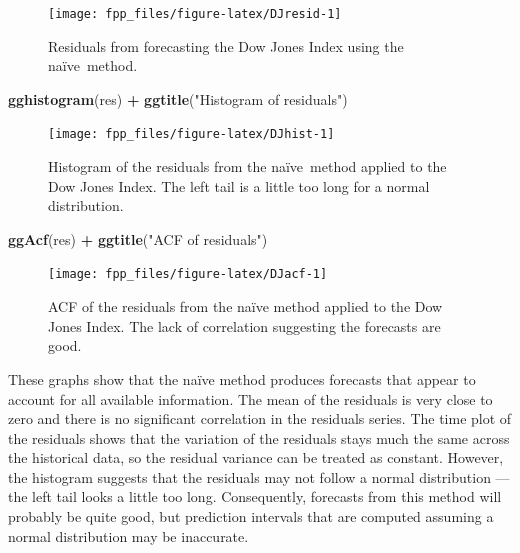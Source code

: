 \documentclass[]{book}
\newenvironment{Shaded}{\begin{snugshade}}{\end{snugshade}}
\newcommand{\KeywordTok}[1]{\textcolor[rgb]{0.13,0.29,0.53}{\textbf{#1}}}
\newcommand{\NormalTok}[1]{#1}
\newcommand{\OperatorTok}[1]{\textcolor[rgb]{0.81,0.36,0.00}{\textbf{#1}}}
\newcommand{\StringTok}[1]{\textcolor[rgb]{0.31,0.60,0.02}{#1}}
\begin{document}
\begin{figure}

{\centering \texttt{[image: fpp\_files/figure-latex/DJresid-1]} 

}

\caption{Residuals from forecasting the Dow Jones Index using the naïve method.}\label{fig:DJresid}
\end{figure}

\begin{Shaded}
\begin{Highlighting}[]
\KeywordTok{gghistogram}\NormalTok{(res) }\OperatorTok{+}\StringTok{ }\KeywordTok{ggtitle}\NormalTok{(}\StringTok{"Histogram of residuals"}\NormalTok{)}
\end{Highlighting}
\end{Shaded}

\begin{figure}

{\centering \texttt{[image: fpp\_files/figure-latex/DJhist-1]} 

}

\caption{Histogram of the residuals from the naïve method applied to the Dow Jones Index. The left tail is a little too long for a normal distribution.}\label{fig:DJhist}
\end{figure}

\begin{Shaded}
\begin{Highlighting}[]
\KeywordTok{ggAcf}\NormalTok{(res) }\OperatorTok{+}\StringTok{ }\KeywordTok{ggtitle}\NormalTok{(}\StringTok{"ACF of residuals"}\NormalTok{)}
\end{Highlighting}
\end{Shaded}

\begin{figure}

{\centering \texttt{[image: fpp\_files/figure-latex/DJacf-1]} 

}

\caption{ACF of the residuals from the naïve method applied to the Dow Jones Index. The lack of correlation suggesting the forecasts are good.}\label{fig:DJacf}
\end{figure}

These graphs show that the naïve method produces forecasts that appear to account for all available information. The mean of the residuals is very close to zero and there is no significant correlation in the residuals series. The time plot of the residuals shows that the variation of the residuals stays much the same across the historical data, so the residual variance can be treated as constant. However, the histogram suggests that the residuals may not follow a normal distribution --- the left tail looks a little too long. Consequently, forecasts from this method will probably be quite good, but prediction intervals that are computed assuming a normal distribution may be inaccurate.
\end{document}
